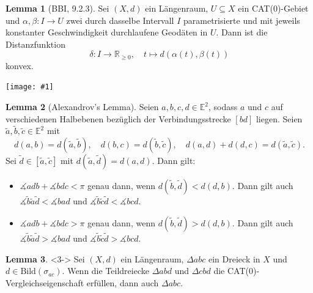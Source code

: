 \documentclass{beamer}
\newcommand{\E}{\mathbb{E}} %
\newcommand{\R}{\mathbb{R}} %
\newcommand{\Bild}{\mathrm{Bild}} %
\theoremstyle{definition}
\newtheorem*{lem}{Lemma}
\newcommand{\framedgraphic}[1] {
  \begin{frame}
    \begin{center}
      \vspace{-10pt}
      \texttt{[image: \#1]}
    \end{center}
  \end{frame}
}
\begin{document}
\begin{frame}
  \begin{lem}[BBI, 9.2.3]
    Sei $(X, d)$ ein Längenraum, $U \subseteq X$ ein CAT($0$)-Gebiet und $\alpha, \beta : I \to U$ zwei durch dasselbe Intervall $I$ parametrisierte und mit jeweils konstanter Geschwindigkeit durchlaufene Geodäten in $U$. Dann ist die Distanzfunktion
    \[ \delta : I \to \R_{\geq 0}, \quad t \mapsto d(\alpha(t), \beta(t)) \]
    konvex.
  \end{lem}
\end{frame}


\framedgraphic{bilder/Picture15.jpg}

\begin{frame}
  \begin{lem}[Alexandrov's Lemma]
    Seien $a, b, c, d \in \E^2$, sodass $a$ und $c$ auf verschiedenen Halbebenen bezüglich der Verbindungsstrecke $[bd]$ liegen. Seien $\tilde{a}, \tilde{b}, \tilde{c} \in \E^2$ mit
    \[
      d(a, b) = d(\tilde{a}, \tilde{b}), \quad
      d(b, c) = d(\tilde{b}, \tilde{c}), \quad
      d(a, d) + d(d, c) = d(\tilde{a}, \tilde{c}).
    \]
    Sei $\tilde{d} \in [\tilde{a}, \tilde{c}]$ mit $d(\tilde{a}, \tilde{d}) = d(a, d)$. Dann gilt:
    \begin{itemize}
      \item<1-> $\measuredangle adb + \measuredangle bdc < \pi$ genau dann, wenn $d(\tilde{b}, \tilde{d}) < d(d, b)$. Dann gilt auch $\measuredangle \tilde{b} \tilde{a} \tilde{d} < \measuredangle bad$ und $\measuredangle \tilde{b} \tilde{c} \tilde{d} < \measuredangle bcd$.
      \item<2-> $\measuredangle adb + \measuredangle bdc > \pi$ genau dann, wenn $d(\tilde{b}, \tilde{d}) > d(d, b)$. Dann gilt auch $\measuredangle \tilde{b} \tilde{a} \tilde{d} > \measuredangle bad$ und $\measuredangle \tilde{b} \tilde{c} \tilde{d} > \measuredangle bcd$.
    \end{itemize}
  \end{lem}

  \begin{lem}<3->
    Sei $(X, d)$ ein Längenraum, $\Delta abc$ ein Dreieck in $X$ und $d \in \Bild(\sigma_{ac})$. Wenn die Teildreiecke $\Delta abd$ und $\Delta cbd$ die CAT($0$)-Vergleichseigenschaft erfüllen, dann auch $\Delta abc$.
  \end{lem}
\end{frame}
\end{document}
